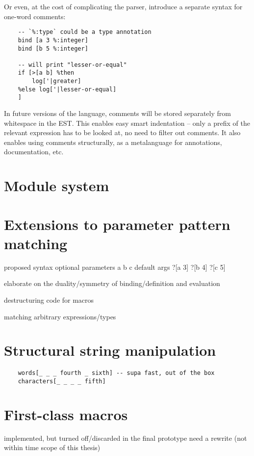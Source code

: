 Or even, at the cost of complicating the parser, introduce a separate syntax for one-word comments:
\begin{lstlisting}
    -- `%:type` could be a type annotation 
    bind [a 3 %:integer]
    bind [b 5 %:integer]

    -- will print "lesser-or-equal"
    if [>[a b] %then
        log['|greater]
    %else log['|lesser-or-equal]
    ]
\end{lstlisting}



In future versions of the language, comments will be stored separately from whitespace in the EST. This enables easy smart indentation -- only a prefix of the relevant expression has to be looked at, no need to filter out comments. It also enables using comments structurally, as a metalanguage for annotations, documentation, etc.

\section{Module system}


\section{Extensions to parameter pattern matching}

    proposed syntax
        optional parameters {a b c}
        default args {?[a 3] ?[b 4] ?[c 5]}

    elaborate on the duality/symmetry of binding/definition and evaluation
    
    destructuring code for macros
    
    matching arbitrary expressions/types

\section{Structural string manipulation}
\begin{lstlisting}
    words[_ _ _ fourth _ sixth] -- supa fast, out of the box
    characters[_ _ _ _ fifth]
\end{lstlisting}

 \section{First-class macros}
 implemented, but turned off/discarded in the final prototype
 need a rewrite (not within time scope of this thesis)
 

